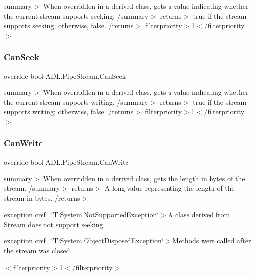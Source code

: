 summary$>$ When overridden in a derived class, gets a value indicating whether the current stream supports seeking. /summary$>$ returns$>$ true if the stream supports seeking; otherwise, false. /returns$>$ filterpriority$>$1$<$/filterpriority$>$ \mbox{\label{class_a_d_l_1_1_pipe_stream_ad891fa332a41aeb44026c5a89ddc36e8}} 
\subsubsection{\texorpdfstring{Can\+Seek}{CanSeek}}
{\footnotesize\ttfamily override bool A\+D\+L.\+Pipe\+Stream.\+Can\+Seek\hspace{0.3cm}{\ttfamily [get]}}

summary$>$ When overridden in a derived class, gets a value indicating whether the current stream supports writing. /summary$>$ returns$>$ true if the stream supports writing; otherwise, false. /returns$>$ filterpriority$>$1$<$/filterpriority$>$ \mbox{\label{class_a_d_l_1_1_pipe_stream_a24b173b85db2cb2c76c8688086e6aebb}} 
\subsubsection{\texorpdfstring{Can\+Write}{CanWrite}}
{\footnotesize\ttfamily override bool A\+D\+L.\+Pipe\+Stream.\+Can\+Write\hspace{0.3cm}{\ttfamily [get]}}

summary$>$ When overridden in a derived class, gets the length in bytes of the stream. /summary$>$ returns$>$ A long value representing the length of the stream in bytes. /returns$>$

exception cref=\char`\"{}\+T\+:\+System.\+Not\+Supported\+Exception\char`\"{}$>$A class derived from Stream does not support seeking. 

exception cref=\char`\"{}\+T\+:\+System.\+Object\+Disposed\+Exception\char`\"{}$>$Methods were called after the stream was closed. 

$<$filterpriority$>$1$<$/filterpriority$>$ \mbox{\label{class_a_d_l_1_1_pipe_stream_a4c9f83e98008f203c5535ad730ca0614}} 
